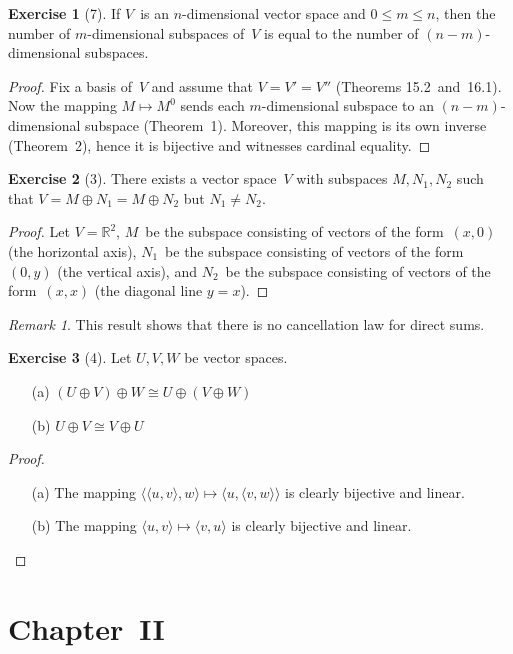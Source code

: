 \documentclass[letterpaper,12pt]{article}
\newcommand{\R}{\mathbb{R}}
\newcommand{\iso}{\cong}
\newcommand{\dsum}{\oplus}
\newcommand{\pair}[2]{\langle{#1},{#2}\rangle}
\theoremstyle{definition}
\newtheorem*{exer}{Exercise}
\theoremstyle{remark}
\newtheorem*{rmk}{Remark}
\theoremstyle{direction}
\begin{document}
\begin{exer}[7]
If \(V\)~is an \(n\)-dimensional vector space and \(0\le m\le n\), then the number of \(m\)-dimensional subspaces of~\(V\) is equal to the number of \((n-m)\)-dimensional subspaces.
\end{exer}
\begin{proof}
Fix a basis of~\(V\) and assume that \(V=V'=V''\) (Theorems 15.2~and~16.1). Now the mapping \(M\mapsto M^0\) sends each \(m\)-dimensional subspace to an \((n-m)\)-dimensional subspace (Theorem~1). Moreover, this mapping is its own inverse (Theorem~2), hence it is bijective and witnesses cardinal equality.
\end{proof}

\begin{exer}[3]
There exists a vector space~\(V\) with subspaces \(M,N_1,N_2\) such that \(V=M\dsum N_1=M\dsum N_2\) but \(N_1\ne N_2\).
\end{exer}
\begin{proof}
Let \(V=\R^2\), \(M\)~be the subspace consisting of vectors of the form~\((x,0)\) (the horizontal axis), \(N_1\)~be the subspace consisting of vectors of the form~\((0,y)\) (the vertical axis), and \(N_2\)~be the subspace consisting of vectors of the form~\((x,x)\) (the diagonal line \(y=x\)).
\end{proof}
\begin{rmk}
This result shows that there is no cancellation law for direct sums.
\end{rmk}

\begin{exer}[4]
Let \(U,V,W\) be vector spaces.
\begin{enumerate}
\item[(a)] \((U\dsum V)\dsum W\iso U\dsum(V\dsum W)\)
\item[(b)] \(U\dsum V\iso V\dsum U\)
\end{enumerate}
\end{exer}
\begin{proof}\
\begin{enumerate}
\item[(a)] The mapping \(\pair{\pair{u}{v}}{w}\mapsto\pair{u}{\pair{v}{w}}\) is clearly bijective and linear.
\item[(b)] The mapping \(\pair{u}{v}\mapsto\pair{v}{u}\) is clearly bijective and linear.\qedhere
\end{enumerate}
\end{proof}

\section*{Chapter~II}
\end{document}
